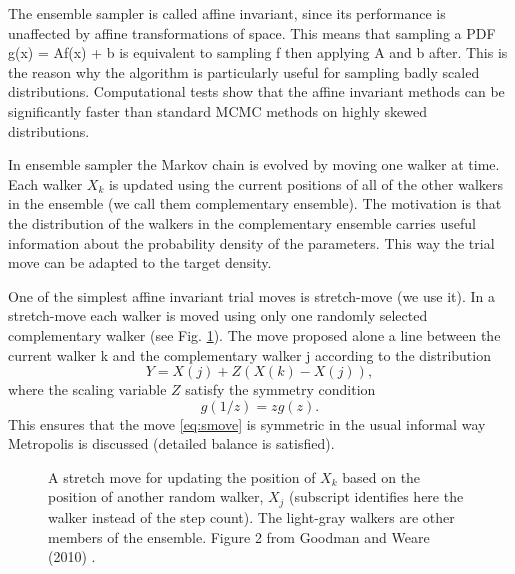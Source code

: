 \documentclass{wihuri}
\def\be{\begin{equation}}
\def\ee{\end{equation}}
\begin{document}


The ensemble sampler is called affine invariant, since its performance is unaffected by affine transformations of space. This means that sampling a PDF g(x) = Af(x) + b is equivalent to sampling
f then applying A and b after. This is the reason why the algorithm is particularly useful for sampling badly scaled distributions. Computational tests show that the affine invariant methods can be significantly faster than standard MCMC methods on highly skewed distributions.

In ensemble sampler the  Markov chain is evolved by moving one walker at time. Each walker $X_{k}$ is updated using the current positions of all of the other walkers in
the ensemble (we call them complementary ensemble). The motivation is that the distribution of the walkers in the complementary ensemble carries useful information about the probability density of the parameters. This way the trial move can be adapted to the target density.  





One of the simplest affine invariant trial moves is stretch-move (we use it). In a stretch-move each walker is moved using only one randomly selected complementary walker (see Fig. \ref{fig:smove}). The move proposed alone a line between the current walker k and the complementary walker j according to the distribution \cite{emceehammer}
\be \label{eq:smove}
Y = X(j) + Z(X(k)-X(j)),
\ee
where the scaling variable $Z$ satisfy the symmetry condition
\be \label{eq:symmetry_condition}
g(1/z) = zg(z).
\ee
This ensures that the move \ref{eq:smove} is symmetric in the usual informal way Metropolis is discussed (detailed balance is satisfied).


\begin{figure}
\centerline{}
\caption{A stretch move for updating the position of $X_{k}$ based on the position of another random walker, $X_{j}$ (subscript identifies here the walker instead of the step count). The light-gray walkers are other members of the ensemble. Figure 2 from Goodman and Weare (2010) \cite{ensemble1}.
\label{fig:smove}}
\end{figure}
\end{document}
